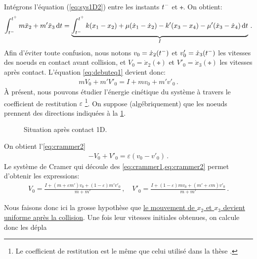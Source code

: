 \noindent Intégrons l'équation (\ref{eq:sys1D2}) entre les instants $t^{-}$ et $\tplus$. On obtient:
\begin{align}    \label{eq:debuteq1}
    \int_{\tmoins}^{\tplus} m\ddot x_2 + m'\ddot x_3 \diff t = \underbrace{\int_{\tmoins}^{\tplus} k(x_1 - x_2) + \mu (\dot x_1 - \dot x_2) - k'(x_3 - x_4) - \mu'(\dot x_3 - \dot x_4) \diff t}_{I} \,.
\end{align}
Afin d'éviter toute confusion, nous notons $v_0 = \dot{x}_2(t^{-})$ et $v'_0 = \dot{x}_3(t^{-})$ les vitesses des noeuds en contact avant collision, et $V_0 = \dot{x}_2(\tplus)$ et $V'_0 = \dot{x}_3(\tplus)$ les vitesses après contact. L'équation \cref{eq:debuteq1} devient donc:
\begin{align} \label{eq:crammer1}
    mV_0 + m'V'_0 = I + mv_0 + m'v'_0 \,.
\end{align}
À présent, nous pouvons étudier l'énergie cinétique du système à travers le coefficient de restitution $\varepsilon$ \footnote{Le coefficient de restitution est le même que celui utilisé dans la thèse \parencite{rabatel2015thesis}.}. On suppose (algébriquement) que les noeuds prennent des directions indiquées à la \cref{fig:contact1dapres}. 
\begin{figure}[!h]
    \centering
    \caption{Situation après contact 1D.}
    \label{fig:contact1dapres}
\end{figure}

\noindent On obtient l'\cref{eq:crammer2}
\begin{align} \label{eq:crammer2}
    - V_0 + V'_0 = \varepsilon (v_0 - v'_0) \,.
\end{align}
Le système de Cramer qui découle des \cref{eq:crammer1,eq:crammer2} permet d'obtenir les expressions:
\begin{align}
    V_0 = \frac{I + (m+\varepsilon m')v_0 + (1-\varepsilon)m'v'_0}{m+m'} \,, \quad V'_0 = \frac{I + (1-\varepsilon)mv_0 + (m'+\varepsilon m)v'_0}{m+m'} \,.
\end{align}

Nous faisons donc ici la grosse hypothèse que \underline{le mouvement de $x_2$ et $x_3$ devient uniforme après la collision}. Une fois leur vitesses initiales obtenues, on calcule donc les dépla



























